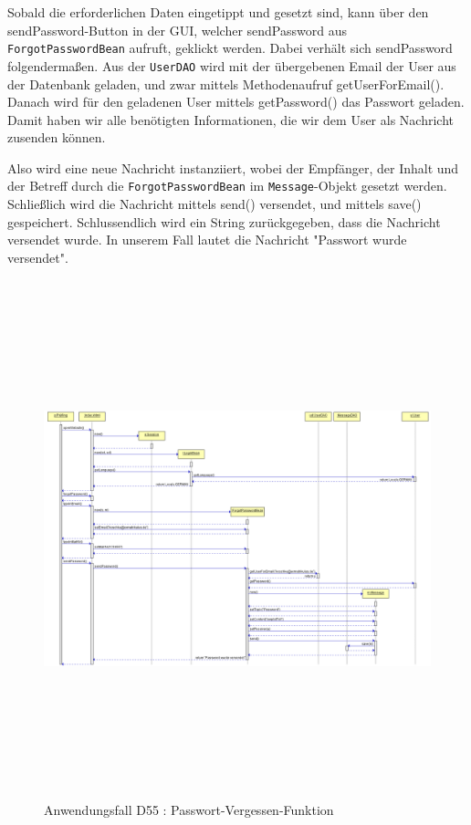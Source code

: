 Sobald die erforderlichen Daten eingetippt und gesetzt sind, kann über den sendPassword-Button in der GUI, welcher sendPassword aus \texttt {ForgotPasswordBean} aufruft, geklickt werden. Dabei verhält sich sendPassword folgendermaßen.
Aus der \texttt {UserDAO} wird mit der übergebenen Email der User aus der Datenbank geladen, und zwar mittels Methodenaufruf getUserForEmail(). Danach wird für den geladenen User mittels getPassword() das Passwort geladen. Damit haben wir alle benötigten Informationen, die wir dem User als Nachricht zusenden können.

Also wird eine neue Nachricht instanziiert, wobei der Empfänger, der Inhalt und der Betreff  durch die \texttt {ForgotPasswordBean} im \texttt {Message}-Objekt gesetzt werden.
Schließlich wird die Nachricht  mittels send() versendet, und mittels save() gespeichert. Schlussendlich wird ein String zurückgegeben, dass die Nachricht versendet wurde. In unserem Fall lautet die Nachricht "Passwort wurde versendet".

\begin{figure}[H]
	\centering
	\includegraphics[width=\textwidth,height=15cm,keepaspectratio]{../UMLDiagramme/d55_forgotPassword.png}
	\caption{Anwendungsfall D55 : Passwort-Vergessen-Funktion}
	\label{fig1}
\end{figure}


